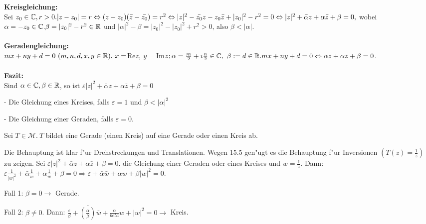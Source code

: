 \documentclass[a4paper,twoside,DIV15,BCOR12mm]{scrbook}
\begin{document}
{\bf Kreisgleichung:}\\
Sei $z_0 \in \mathbb{C}, r>0. |z-z_0|=r \Leftrightarrow (z-z_0)(\bar{z}-\bar{z_0}) = r^2 \Leftrightarrow |z|^2 - \bar{z_0}z-z_0\bar{z}+|z_0|^2-r^2=0 \Leftrightarrow |z|^2 + \bar{\alpha}z + \alpha\bar{z}+\beta=0,$ wobei $\alpha = -z_0 \in \mathbb{C}. \beta = |z_0|^2-r^2 \in \mathbb{R}$ und $|\alpha|^2-\beta = |z_0|^2-|z_0|^2+r^2 > 0$, also $ \beta < |\alpha|$.\\
\\
{\bf Geradengleichung:}\\
$mx+ny+d=0 \ (m,n,d,x,y \in \mathbb{R}). \ x = $Re$ z, \ y= $Im$ z; \alpha = \frac{m}{2}+i\frac{n}{2} \in \MdC, \ \beta := d \in \MdR. mx+ny+d = 0 \Leftrightarrow \bar{\alpha}z+\alpha\bar{z}+\beta=0$.\\
\\
{\bf Fazit:}\\
Sind $\alpha \in \mathbb{C}, \beta \in \mathbb{R}$, so ist $\varepsilon |z|^2 + \bar{\alpha}z + \alpha\bar{z}+\beta = 0$
\begin{liste}
\item[-] Die Gleichung eines Kreises, falls $\varepsilon = 1$ und $\beta < |\alpha|^2$
\item[-] Die Gleichung einer Geraden, falls $\varepsilon = 0.$
\end{liste}

\begin{satz}
Sei $T \in \mathcal{M}.\ T$ bildet eine Gerade (einen Kreis) auf eine Gerade oder einen Kreis ab.
\end{satz}

\begin{beweis}
Die Behauptung ist klar f"ur Drehstreckungen und Translationen. Wegen 15.5 gen"ugt es die Behauptung f"ur Inversionen $(T(z) = \frac1z)$ zu zeigen. Sei $\varepsilon|z|^2 + \bar{\alpha}z + \alpha\bar{z}+\beta =0$. die Gleichung einer Geraden oder eines Kreises und $w = \frac1z$. Dann: $\varepsilon \frac1{|w|^2}+ \bar{\alpha}\frac1w + \alpha \frac1{\bar{w}}+ \beta = 0 \Rightarrow \varepsilon + \bar{\alpha}\bar{w}+\alpha w + \beta |w|^2 = 0.$
\begin{liste}
\item[Fall 1:] $\beta = 0 \rightarrow$ Gerade.
\item[Fall 2:] $\beta \not=0$. Dann: $\frac{\varepsilon}{\beta} + \overline{\left(\frac{\alpha}{\beta}\right)} \bar{w} + \frac{\alpha}{beta}w + |w|^2 = 0 \rightarrow$ Kreis.
\end{liste}
\end{beweis}
\end{document}
